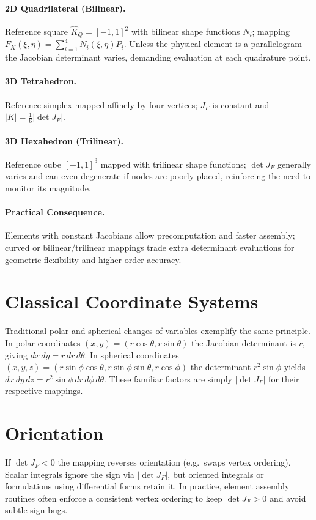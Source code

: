 \documentclass[11pt]{article}
\begin{document}
\paragraph{2D Quadrilateral (Bilinear).} Reference square $\hat K_Q={[-1,1]}^2$ with bilinear shape functions $N_i$; mapping $F_K(\xi,\eta)=\sum_{i=1}^4 N_i(\xi,\eta)P_i$. Unless the physical element is a parallelogram the Jacobian determinant varies, demanding evaluation at each quadrature point.

\paragraph{3D Tetrahedron.} Reference simplex mapped affinely by four vertices; $J_F$ is constant and $|K|=\tfrac16|\det J_F|$.

\paragraph{3D Hexahedron (Trilinear).} Reference cube ${[-1,1]}^3$ mapped with trilinear shape functions; $\det J_F$ generally varies and can even degenerate if nodes are poorly placed, reinforcing the need to monitor its magnitude.

\paragraph{Practical Consequence.} Elements with constant Jacobians allow precomputation and faster assembly; curved or bilinear/trilinear mappings trade extra determinant evaluations for geometric flexibility and higher-order accuracy.

\section{Classical Coordinate Systems}
Traditional polar and spherical changes of variables exemplify the same principle. In polar coordinates $(x,y)=(r\cos\theta,r\sin\theta)$ the Jacobian determinant is $r$, giving $dx\,dy=r\,dr\,d\theta$. In spherical coordinates $(x,y,z)=(r\sin\phi\cos\theta, r\sin\phi\sin\theta, r\cos\phi)$ the determinant $r^2\sin\phi$ yields $dx\,dy\,dz = r^2\sin\phi\, dr\, d\phi\, d\theta$. These familiar factors are simply $|\det J_F|$ for their respective mappings.

\section{Orientation}
If $\det J_F<0$ the mapping reverses orientation (e.g.\ swaps vertex ordering). Scalar integrals ignore the sign via $|\det J_F|$, but oriented integrals or formulations using differential forms retain it. In practice, element assembly routines often enforce a consistent vertex ordering to keep $\det J_F>0$ and avoid subtle sign bugs.
\end{document}
